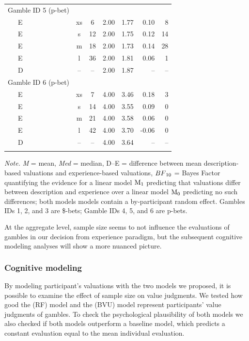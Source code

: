 \documentclass[a4paper, man, floatsintext]{apa6}
\begin{document}
\begin{table}[tbp]
\begin{center}
\begin{threeparttable}
\begin{tabular}{lccccrr}
Gamble ID 5 (p-bet) &  &  &  &  &  & \\
\ \ \ E & xs & 6 & 2.00 & 1.77 & 0.10 & 8\\
\ \ \ E & s & 12 & 2.00 & 1.75 & 0.12 & 14\\
\ \ \ E & m & 18 & 2.00 & 1.73 & 0.14 & 28\\
\ \ \ E & l & 36 & 2.00 & 1.81 & 0.06 & 1\\
\ \ \ D & -- & -- & 2.00 & 1.87 & -- & --\\
Gamble ID 6 (p-bet) &  &  &  &  &  & \\
\ \ \ E & xs & 7 & 4.00 & 3.46 & 0.18 & 3\\
\ \ \ E & s & 14 & 4.00 & 3.55 & 0.09 & 0\\
\ \ \ E & m & 21 & 4.00 & 3.58 & 0.06 & 0\\
\ \ \ E & l & 42 & 4.00 & 3.70 & -0.06 & 0\\
\ \ \ D & -- & -- & 4.00 & 3.64 & -- & --\\
\bottomrule
\addlinespace
\end{tabular}

\begin{tablenotes}[para]
\normalsize{\textit{Note.} \textit{M} = mean, \textit{Med} = median, D--E = difference between mean description-based valuations and experience-based valuations, $BF\textsubscript{10}$ = Bayes Factor quantifying the evidence for a linear model $\mathrm{M}\textsubscript{1}$ predicting that valuations differ between description and experience over a linear model $\mathrm{M}\textsubscript{0}$ predicting no such differences; both models models contain a by-participant random effect. Gambles IDs 1, 2, and 3 are \$-bets; Gamble IDs 4, 5, and 6 are p-bets.}
\end{tablenotes}

\end{threeparttable}
\end{center}

\end{table}

At the aggregate level, sample size seems to not influence the
evaluations of gambles in our decision from experience paradigm, but the
subsequent cognitive modeling analyses will show a more nuanced picture.

\subsubsection{Cognitive modeling}

By modeling participant's valuations with the two models we proposed, it
is possible to examine the effect of sample size on value judgments. We
tested how good the  (RF) model and the
 (BVU) model represent
participants' value judgments of gambles. To check the psychological
plausibility of both models we also checked if both models outperform a
baseline model, which predicts a constant evaluation equal to the mean
individual evaluation.
\end{document}
